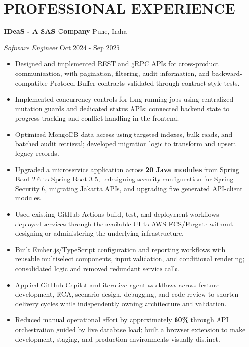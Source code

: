 \documentclass[a4paper,10pt]{article}
\begin{document}
\section{PROFESSIONAL EXPERIENCE}
\textbf{IDeaS - A SAS Company} \hfill Pune, India\par
\textit{Software Engineer} \hfill Oct 2024 - Sep 2026\par
\begin{itemize}
\item Designed and implemented REST and gRPC APIs for cross-product communication, with pagination, filtering, audit information, and backward-compatible Protocol Buffer contracts validated through contract-style tests.
\item Implemented concurrency controls for long-running jobs using centralized mutation guards and dedicated status APIs; connected backend state to progress tracking and conflict handling in the frontend.
\item Optimized MongoDB data access using targeted indexes, bulk reads, and batched audit retrieval; developed migration logic to transform and upsert legacy records.
\item Upgraded a microservice application across \textbf{20 Java modules} from Spring Boot 2.6 to Spring Boot 3.5, redesigning security configuration for Spring Security 6, migrating Jakarta APIs, and upgrading five generated API-client modules.
\item Used existing GitHub Actions build, test, and deployment workflows; deployed services through the available UI to AWS ECS/Fargate without designing or administering the underlying infrastructure.
\item Built Ember.js/TypeScript configuration and reporting workflows with reusable multiselect components, input validation, and conditional rendering; consolidated logic and removed redundant service calls.
\item Applied GitHub Copilot and iterative agent workflows across feature development, RCA, scenario design, debugging, and code review to shorten delivery cycles while independently owning architecture and validation.
\item Reduced manual operational effort by approximately \textbf{60\%} through API orchestration guided by live database load; built a browser extension to make development, staging, and production environments visually distinct.
\end{itemize}
\end{document}
